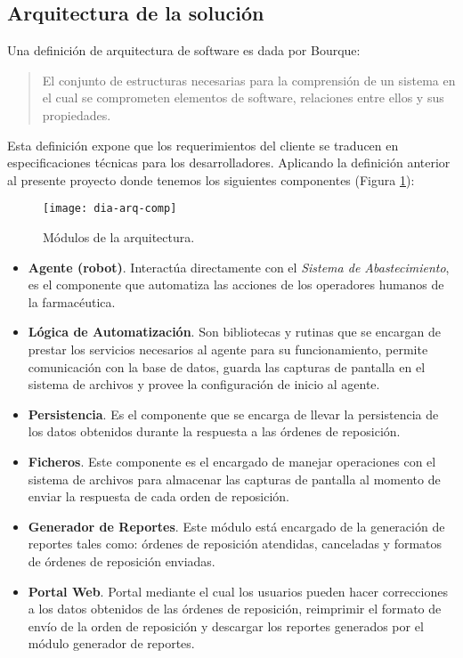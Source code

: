 \subsection{Arquitectura de la solución}
Una definición de arquitectura de software es dada por Bourque\cite{SWEBOOK}:
\begin{quote}
El conjunto de estructuras necesarias para la comprensión de un sistema en el cual se comprometen elementos de software, relaciones entre ellos y sus propiedades.
\end{quote}
Esta definición expone que los requerimientos del cliente se traducen en especificaciones técnicas para los desarrolladores. Aplicando la definición anterior al presente proyecto donde tenemos los siguientes componentes (Figura \ref{fig:dia-arq-comp}):
\begin{figure}[h]
\centering
\texttt{[image: dia-arq-comp]} 
\caption{Módulos de la arquitectura.}
\label{fig:dia-arq-comp}
\end{figure}
\pagebreak
\begin{itemize}
\item \textbf{Agente (robot)}. Interactúa directamente con el \textit{Sistema de Abastecimiento}, es el componente que automatiza las acciones de los operadores humanos de la farmacéutica.
\item \textbf{Lógica de Automatización}. Son bibliotecas y rutinas que se encargan de prestar los servicios necesarios al agente para su funcionamiento, permite comunicación con la base de datos, guarda las capturas de pantalla en el sistema de archivos y provee la configuración de inicio al agente.
\item \textbf{Persistencia}. Es el componente que se encarga de llevar la persistencia de los datos obtenidos durante la respuesta a las órdenes de reposición.
\item \textbf{Ficheros}. Este componente es el encargado de manejar operaciones con el sistema de archivos para almacenar las capturas de pantalla al momento de enviar la respuesta de cada orden de reposición.
\item \textbf{Generador de Reportes}. Este módulo está encargado de la generación de reportes tales como: órdenes de reposición atendidas, canceladas y formatos de órdenes de reposición enviadas.
\item \textbf{Portal Web}. Portal mediante el cual los usuarios pueden hacer correcciones a los datos obtenidos de las órdenes de reposición, reimprimir el formato de envío de la orden de reposición  y descargar los reportes generados por el módulo generador de reportes.
\end{itemize}

